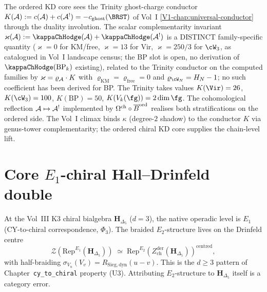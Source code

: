 \begin{remark}
\label{rem:ordered-kd-core-conductor-bridge}
The ordered KD core sees the Trinity ghost-charge conductor
$K(\cA) := c(\cA) + c(\cA^!) = -c_{\mathrm{ghost}}(\BRST)$ of Vol~I
\cref{V1-chap:universal-conductor} through the duality involution.
The scalar complementarity invariant
$\varkappa(\cA) := \kappaChHodge(\cA) + \kappaChHodge(\cA^!)$ is a DISTINCT
family-specific quantity ($\varkappa = 0$ for KM/free, $\varkappa = 13$
for Vir, $\varkappa = 250/3$ for $\cW_3$, as catalogued in Vol~I
landscape census; the BP slot is open, no derivation of
$\kappaChHodge(\mathrm{BP}_k)$ existing), related to the Trinity
conductor on the computed families by
$\varkappa = \varrho_{\mathcal{A}}\cdot K$ with
$\varrho_{\mathrm{KM}} = \varrho_{\mathrm{free}} = 0$ and
$\varrho_{\cW_N} = H_N - 1$; no such coefficient has been derived
for BP. The
Trinity takes values $K(\Vir) = 26$, $K(\cW_3) = 100$,
$K(\mathrm{BP}) = 50$, $K(V_k(\fg)) = 2\dim\fg$. The cohomological
reflection $\mathcal{A} \mapsto \mathcal{A}^!$ implemented by $\Omega^{\mathrm{ch}}\circ
\overline{B}^{\mathrm{ord}}$ realises both stratifications on the ordered side. The Vol~I climax binds $\kappa$ (degree-$2$ shadow)
to the conductor $K$ via genus-tower complementarity; the
ordered chiral KD core supplies the chain-level lift.
\end{remark}

\section{Core \(E_1\)-chiral Hall--Drinfeld double}
\label{sec:oackd-core-supplement}

\begin{remark}[\texorpdfstring{\(E_1\)-native at \(d = 3\) with \(E_2\) via Drinfeld centre}{E1-native at d = 3 with E2 via Drinfeld centre}]
\label{rem:oackd-core-E1-E2}
At the Vol~III K3 chiral bialgebra $\mathbf{H}_{\Delta_5}$ ($d = 3$), the native operadic level
is $E_1$ (CY-to-chiral correspondence, $\Phi_3$). The braided $E_2$-structure lives on
the Drinfeld centre
\[
 \mathcal{Z}(\mathrm{Rep}^{E_1}(\mathbf{H}_{\Delta_5})) \;\simeq\; \mathrm{Rep}^{E_2}(Z^{\mathrm{der}}_{\mathrm{ch}}(\mathbf{H}_{\Delta_5}))^{\mathrm{centred}},
\]
with half-braiding $\sigma_{V_u}(V_v) = R_{\mathrm{Sieg,dyn}}(u - v)$. This is the $d \ge 3$
pattern of Chapter~\texttt{cy\_to\_chiral} property (U$3$). Attributing $E_2$-structure to
$\mathbf{H}_{\Delta_5}$ itself is a category error.
\end{remark}

